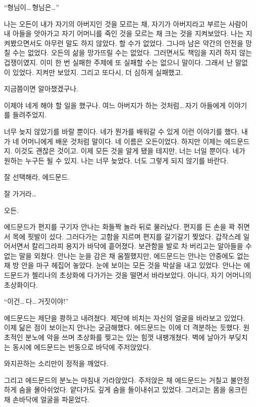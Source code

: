 ``형님이\ldots\,형님은\ldots''\begin{letter}

나는 오든이 내가 자기의 아버지인 것을 모르는 채, 자기가 아버지라고 부르는 사람이 내 아들을 앗아가고 자기 어머니를 죽인 것을 모르는 채 크는 것을 지켜보았다. 나는 지켜봤으면서도 아무런 말도 하지 않았다. 할 수가 없었다. 그나마 남은 약간의 안전을 망칠 수는 없었다. 오든의 삶을 망가뜨릴 수는 없었다. 그러면서도 책임을 지려 하지 않는 겁쟁이였지. 이미 한 번 실패한 주제에 또 실패할 수는 없으니 말이다. 그래서 난 말없이 있었다. 지켜만 보았지. 그리고 또다시, 더 심하게 실패했고.

지금쯤이면 알아챘겠구나.

이제야 네게 해야 할 일을 했구나. 여느 아버지가 하는 것처럼\ldots\,자기 아들에게 이야기를 들려주었지.

너무 늦지 않았기를 바랄 뿐이다. 네가 뭔가를 배워갈 수 있게 이런 이야기를 했다, 내가 네 어머니에게 배운 것처럼 말이다. 네 이름은 오든이었다. 하지만 이제는 에드문드지. 이것도 괜찮은 것이고. 이제 모든 것을 알게 됐을 테지만, 너는 너일 뿐이다. 네가 원하는 누구든 될 수 있지. 나는 너무 늦었다. 너도 그렇게 되지 않기를 바란다.

잘 선택해라, 에드문드.

잘 가거라\ldots

오든.

\end{letter}

에드문드가 편지를 구기자 안나는 화들짝 놀라 뒤로 물러났다. 편지를 든 손을 꽉 쥐면서 목에 핏발이 섰다. 그러다가는 고함을 지르며 편지를 갈기갈기 찢었다. 갑작스레 일어서면서 칼리그라피 용지가 바닥에 흩어졌다. 보관함을 발로 차 버리고는 알아들을 수 없는 말을 외쳤다. 안나는 눈을 감은 채 움찔했지만, 에드문드는 안나는 안중에도 없는 채 방 안을 마구 헤집어 놓았다. 눈에 보이는 모든 것을 박살을 내고 있었다. 안나는 에드문드가 첼리나의 초상화에 다가가는 것을 떨면서 바라보았다. 아니다, 자기 어머니의 초상화이다.

``이건\ldots\,다\ldots\,거짓이야!''

에드문드는 제단을 쾅하고 내려쳤다. 제단에 비치는 자신의 얼굴을 바라보고 있었다. 이제 닮은 점이 보이는지 안나는 궁금해했다. 에드문드는 이에 더 격분하는 듯했다. 원초적인 분노에 악을 쓰며 초상화를 찢고는 있는 힘껏 내팽개쳤다. 벽에 날아가 부딪치는 동시에 에드문드는 반동으로 바닥에 주저앉았다.

와지끈하는 소리만이 정적을 깨었다.

그리고 에드문드의 분노는 마침내 가라앉았다. 주저앉은 채 에드문드는 거칠고 불안정하게 숨을 몰아쉬었다. 얕다가도 깊게 숨을 들이내쉬고 있었다. 그러고는 몸을 웅크린 채 손바닥에 얼굴을 파묻었다.

